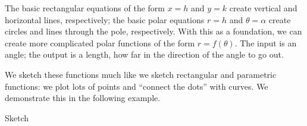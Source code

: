 The basic rectangular equations of the form $x=h$ and $y=k$ create vertical and horizontal lines, respectively; the basic polar equations $r= h$ and $\theta =\alpha$ create circles and lines through the pole, respectively. With this as a foundation, we can create more complicated polar functions of the form $r=f(\theta)$. The input is an angle; the output is a length, how far in the direction of the angle to go out.

We sketch these functions much like we sketch rectangular and parametric functions: we plot lots of points and ``connect the dots'' with curves. We demonstrate this in the following example.

\begin{example}\label{ex_polar4}%
Sketch
%
\end{example}
